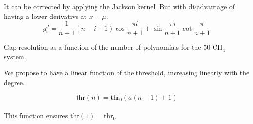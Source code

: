 It can be corrected by applying the Jackson kernel. But with disadvantage of having a lower derivative at $x = \mu$.
\begin{equation}
       g^J_i = \frac{1}{n+1} (n - i + 1) \cos \frac{\pi i}{n+1} 
             +   \sin \frac{\pi i}{n+1} \cot \frac{\pi}{n+1}
\end{equation}
   \begin{center}
   \end{center}  

Gap resolution as a function of the number of polynomials for the 50 CH$_4$ system.
   \begin{center}
   \end{center}  

We propose to have a linear function of the threshold, increasing linearly with the degree. 

\begin{equation}
   \mathrm{thr}(n) = \mathrm{thr_0}(a(n-1)+1)
\end{equation}
\\
\vspace{0.5cm}
This function ensures $\mathrm{thr}(1) = \mathrm{thr_0}$

